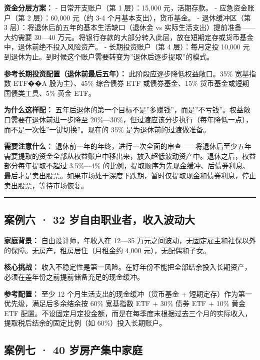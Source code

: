 \documentclass[a4paper,11pt,oneside,fontset=none,UTF8,zihao=-4]{ctexbook}
\begin{document}
\textbf{资金分层方案：} - 日常开支账户（第 1 层）：15,000 元，活期存款。
- 应急资金账户（第 2 层）：60,000 元（约 3-4 个月基本支出），货币基金。
- 退休缓冲区（第 3 层）：将退休后前五年的基本生活缺口（退休金 vs
实际生活支出）提前准备------大约需要 30---40
万元。将银行存款的大部分转入此层，放在短期定存或货币基金中，退休前绝不投入风险资产。
- 长期投资账户（第 4 层）：每月定投 10,000
元到退休为止。到时候这个账户需要转变为''退休后逐步提取''的模式。

\textbf{参考长期投资配置（退休前最后五年）：}
此阶段应逐步降低权益敞口。35\% 宽基指数 ETF��A 股为主）、45\% 综合债券
ETF 或债券基金、15\% 货币基金或短期国债类工具、5\% 黄金 ETF。

\textbf{为什么这样配：}
五年后退休的第一个目标不是''多赚钱''，而是''不亏钱''。权益敞口需要在退休前进一步降至
20\%---30\%，但过渡应该分步执行（每年降低一点），而不是一次性''一键切换''。现在的
35\% 是为退休前的过渡做准备。

\textbf{需要注意什么：}
退休前一年的年终，进行一次全面的审查------将退休后至少五年需要提取的资金全部从权益账户中移出来，放入超低波动资产中。退休之后，权益部分每年提取不超过
3.5\%---4\%
的比例，提取顺序为先现金缓冲、后债券利息、最后才是卖出股票。如果市场处于深度下跌期，暂时仅提取现金和债券利息，停止卖出股票，等待市场恢复。

\begin{center}{\color{dh-bronze}\rule{0.2\textwidth}{0.5pt}}\end{center}

\subsection{案例六 · 32
岁自由职业者，收入波动大}\label{ux6848ux4f8bux516d-32-ux5c81ux81eaux7531ux804cux4e1aux8005ux6536ux5165ux6ce2ux52a8ux5927}

\textbf{家庭背景：} 自由设计师，年收入在 12---35
万元之间波动，无固定雇主和社保以外的保障。无房产，租房居住（月租金约
4,000 元），无配偶和子女。

\textbf{核心挑战：}
收入不稳定性是第一风险。在好年份不能把全部结余投入长期资产，必须在差年份之前提前储备充足的现金缓冲。

\textbf{参考配置：} 至少 12 个月生活支出的现金缓冲（货币基金 +
短期定存）作为第一优先级，满足后多余结余按 60\% 宽基指数 ETF + 30\% 债券
ETF + 10\% 黄金 ETF
配置。不设固定月定投金额，而是在每季度末根据过去三个月的实际收入，提取税后结余的固定比例（如
60\%）投入长期账户。

\subsection{案例七 · 40
岁房产集中家庭}\label{ux6848ux4f8bux4e03-40-ux5c81ux623fux4ea7ux96c6ux4e2dux5bb6ux5ead}
\end{document}
